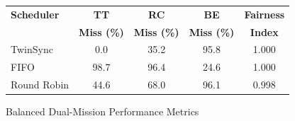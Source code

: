 
\begin{figure}[!t]
\centering
\footnotesize
\begin{tabular}{@{}lcccc@{}}
\toprule
\textbf{Scheduler} & \textbf{TT} & \textbf{RC} & \textbf{BE} & \textbf{Fairness} \\
& \textbf{Miss (\%)} & \textbf{Miss (\%)} & \textbf{Miss (\%)} & \textbf{Index} \\
\midrule
TwinSync & 0.0 & 35.2 & 95.8 & 1.000 \\
FIFO & 98.7 & 96.4 & 24.6 & 1.000 \\
Round Robin & 44.6 & 68.0 & 96.1 & 0.998 \\
\bottomrule
\end{tabular}
\caption{Balanced Dual-Mission Performance Metrics}
\label{fig:balanced_results}
\vspace{-0.3cm}
\end{figure}
